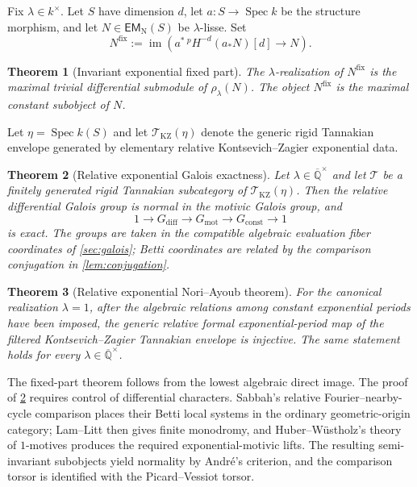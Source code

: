 \documentclass[11pt]{article}
\numberwithin{equation}{section}
\newtheorem{theorem}{Theorem}[section]
\theoremstyle{definition}
\theoremstyle{remark}
\newcommand{\Q}{\mathbb Q}
\newcommand{\Tcal}{\mathcal T}
\newcommand{\im}{\operatorname{im}}
\newcommand{\Spec}{\operatorname{Spec}}
\newcommand{\mot}{\mathrm{mot}}
\newcommand{\diff}{\mathrm{diff}}
\newcommand{\EMN}{\mathsf{EM}_{\mathrm N}}
\newcommand{\const}{\mathrm{const}}
\begin{document}
Fix $\lambda\in k^\times$.  Let $S$ have dimension $d$, let
$a:S\to\Spec k$ be the structure morphism, and let $N\in\EMN(S)$ be
$\lambda$-lisse.  Set
\begin{equation}\label{eq:intro-fixed}
  N^{\mathrm{fix}}
  :=\im\!\left(
       a^*\,{}^p\!H^{-d}(a_*N)[d]\longrightarrow N
     \right).
\end{equation}

\begin{theorem}[Invariant exponential fixed part]\label{thm:intro-fixed}
The $\lambda$-realization of $N^{\mathrm{fix}}$ is the maximal trivial
differential submodule of $\rho_\lambda(N)$.  The object $N^{\mathrm{fix}}$ is
the maximal constant subobject of $N$.
\end{theorem}

Let $\eta=\Spec k(S)$ and let $\Tcal_{\mathrm{KZ}}(\eta)$ denote the generic
rigid Tannakian envelope generated by elementary relative
Kontsevich--Zagier exponential data.

\begin{theorem}[Relative exponential Galois exactness]
\label{thm:intro-exact}
Let $\lambda\in\overline{\Q}^{\times}$ and let $\Tcal$ be a finitely generated
rigid Tannakian subcategory of $\Tcal_{\mathrm{KZ}}(\eta)$.  Then the relative
differential Galois group is normal in the motivic Galois group, and
\[
  1\longrightarrow G_{\diff}
   \longrightarrow G_{\mot}
   \longrightarrow G_{\const}
   \longrightarrow1
\]
is exact.
The groups are taken in the compatible algebraic evaluation
fiber coordinates of \cref{sec:galois}; Betti coordinates are related by
the comparison conjugation in \cref{lem:conjugation}.
\end{theorem}

\begin{theorem}[Relative exponential Nori--Ayoub theorem]
\label{thm:intro-functional}
For the canonical realization $\lambda=1$, after the algebraic relations
among constant exponential periods have been imposed, the generic relative
formal exponential-period map of the filtered Kontsevich--Zagier Tannakian
envelope is injective.  The same statement holds for every
$\lambda\in\overline{\Q}^{\times}$.
\end{theorem}

The fixed-part theorem follows from the lowest algebraic direct image.  The proof
of \cref{thm:intro-exact} requires control of differential characters.
Sabbah's relative Fourier--nearby-cycle comparison places their Betti local
systems in the ordinary geometric-origin category; Lam--Litt then gives finite
monodromy, and Huber--W\"ustholz's theory of $1$-motives produces the required
exponential-motivic lifts.  The resulting semi-invariant subobjects yield
normality by Andr\'e's criterion, and the comparison torsor is identified with
the Picard--Vessiot torsor.
\end{document}
